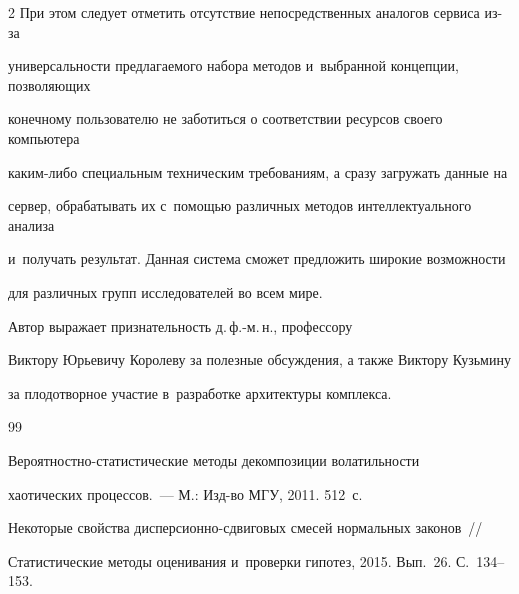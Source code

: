\begin{multicols}{2}
При этом следует отметить отсутствие непосредственных аналогов сервиса из-за 

универсальности предлагаемого набора методов и~выбранной концепции, позволяющих 

конечному пользователю не заботиться о соответствии ресурсов своего компьютера 

ка\-ким-ли\-бо специальным техническим требованиям, а сразу загружать данные на 

сервер, обрабатывать их с~по\-мощью различных методов интеллектуального анализа 

и~получать результат. Данная система сможет предложить широкие возможности 

для различных групп исследователей во всем мире.



\bigskip



{Автор выражает признательность д.\,ф.-м.\,н., профессору 

Виктору Юрьевичу Королеву за полезные обсуждения, а также Виктору Кузьмину 

за плодотворное участие в~разработке архитектуры комплекса.}



{\small\frenchspacing

 {%


 \begin{thebibliography}{99}



Ве\-ро\-ят\-но\-ст\-но-ста\-ти\-сти\-че\-ские методы декомпозиции волатильности

хаотических процессов.~--- М.: Изд-во МГУ, 2011. 512~с.





Некоторые свойства дис\-пер\-си\-он\-но-сдви\-го\-вых смесей нормальных законов~// 

Статистические методы оценивания и~проверки гипотез, 2015. Вып.~26. С.~134--153.




\end{thebibliography}}}
\end{multicols}
